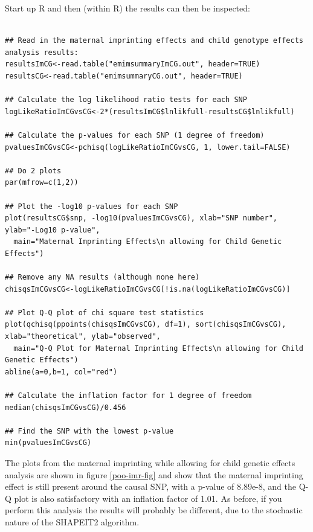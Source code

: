 \documentclass[a4paper,12pt]{article}
\begin{document}
Start up R and then (within R) the results can then be inspected: 
\vspace{0.35cm} \begin{lstlisting}

## Read in the maternal imprinting effects and child genotype effects analysis results:
resultsImCG<-read.table("emimsummaryImCG.out", header=TRUE)
resultsCG<-read.table("emimsummaryCG.out", header=TRUE)

## Calculate the log likelihood ratio tests for each SNP
logLikeRatioImCGvsCG<-2*(resultsImCG$lnlikfull-resultsCG$lnlikfull)

## Calculate the p-values for each SNP (1 degree of freedom)
pvaluesImCGvsCG<-pchisq(logLikeRatioImCGvsCG, 1, lower.tail=FALSE)

## Do 2 plots
par(mfrow=c(1,2))

## Plot the -log10 p-values for each SNP
plot(resultsCG$snp, -log10(pvaluesImCGvsCG), xlab="SNP number", ylab="-Log10 p-value",
  main="Maternal Imprinting Effects\n allowing for Child Genetic Effects")

## Remove any NA results (although none here)
chisqsImCGvsCG<-logLikeRatioImCGvsCG[!is.na(logLikeRatioImCGvsCG)]

## Plot Q-Q plot of chi square test statistics
plot(qchisq(ppoints(chisqsImCGvsCG), df=1), sort(chisqsImCGvsCG), xlab="theoretical", ylab="observed",
  main="Q-Q Plot for Maternal Imprinting Effects\n allowing for Child Genetic Effects") 
abline(a=0,b=1, col="red")

## Calculate the inflation factor for 1 degree of freedom
median(chisqsImCGvsCG)/0.456

## Find the SNP with the lowest p-value
min(pvaluesImCGvsCG)

\end{lstlisting} \vspace{0.35cm}
The plots from the maternal imprinting while allowing for child genetic effects analysis are shown in figure  \ref{poo-imr-fig} and show that the maternal imprinting effect is still present around the causal SNP, with a p-value of 8.89e-8, and the Q-Q plot is also satisfactory with an inflation factor of 1.01. As before, if you perform this analysis the results will probably be different, due to the stochastic nature of the SHAPEIT2 algorithm. 
\end{document}
